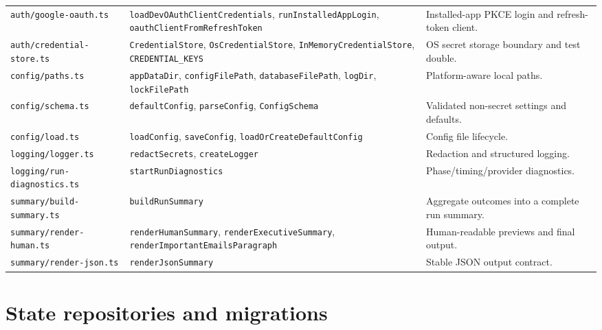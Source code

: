 \documentclass[12pt,oneside]{book}
\newcommand{\code}[1]{\nolinkurl{#1}}
\newcommand{\file}[1]{\nolinkurl{#1}}
\begin{document}
\begin{longtable}{P{3.6cm}P{5.8cm}P{7.0cm}}
\file{auth/google-oauth.ts} & \code{loadDevOAuthClientCredentials}, \code{runInstalledAppLogin}, \code{oauthClientFromRefreshToken} & Installed-app PKCE login and refresh-token client. \\
\file{auth/credential-store.ts} & \code{CredentialStore}, \code{OsCredentialStore}, \code{InMemoryCredentialStore}, \code{CREDENTIAL_KEYS} & OS secret storage boundary and test double. \\
\file{config/paths.ts} & \code{appDataDir}, \code{configFilePath}, \code{databaseFilePath}, \code{logDir}, \code{lockFilePath} & Platform-aware local paths. \\
\file{config/schema.ts} & \code{defaultConfig}, \code{parseConfig}, \code{ConfigSchema} & Validated non-secret settings and defaults. \\
\file{config/load.ts} & \code{loadConfig}, \code{saveConfig}, \code{loadOrCreateDefaultConfig} & Config file lifecycle. \\
\file{logging/logger.ts} & \code{redactSecrets}, \code{createLogger} & Redaction and structured logging. \\
\file{logging/run-diagnostics.ts} & \code{startRunDiagnostics} & Phase/timing/provider diagnostics. \\
\file{summary/build-summary.ts} & \code{buildRunSummary} & Aggregate outcomes into a complete run summary. \\
\file{summary/render-human.ts} & \code{renderHumanSummary}, \code{renderExecutiveSummary}, \code{renderImportantEmailsParagraph} & Human-readable previews and final output. \\
\file{summary/render-json.ts} & \code{renderJsonSummary} & Stable JSON output contract. \\
\bottomrule
\end{longtable}
\endgroup

\section{State repositories and migrations}
\end{document}
